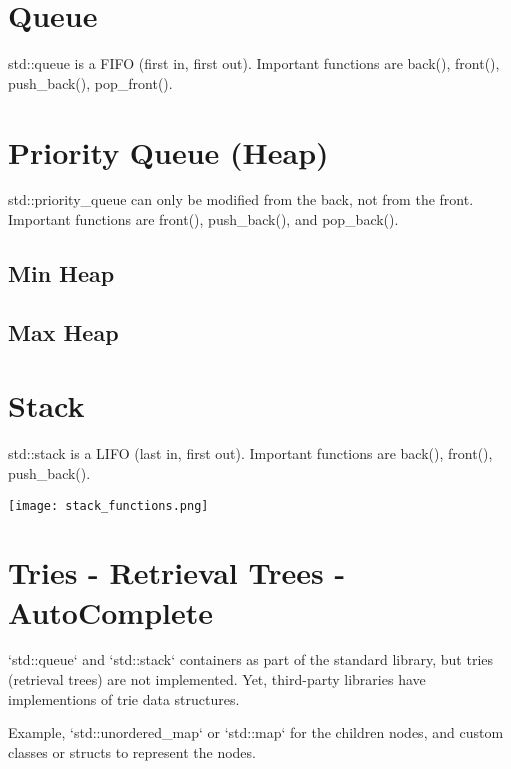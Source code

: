 \documentclass[openany]{report}
\begin{document}
\section{Queue}
std::queue is a FIFO (first in, first out). Important functions are back(), front(), push\_back(), pop\_front().

\section{Priority Queue (Heap)}

std::priority\_queue can only be modified from the back, not from the front. Important functions are front(), push\_back(), 
and pop\_back().

\subsection{Min Heap}
\subsection{Max Heap}

\section{Stack}

std::stack is a LIFO (last in, first out). Important functions are back(), front(), push\_back().

\begin{center}
    \texttt{[image: stack\_functions.png]}
\end{center}

\section{Tries - Retrieval Trees - AutoComplete}

`std::queue` and `std::stack` containers as part of the standard library,
but tries (retrieval trees) are not implemented. 
Yet, third-party libraries have implementions of trie data structures.

Example, `std::unordered\_map` or `std::map` for the children nodes,
and custom classes or structs to represent the nodes.
\end{document}
